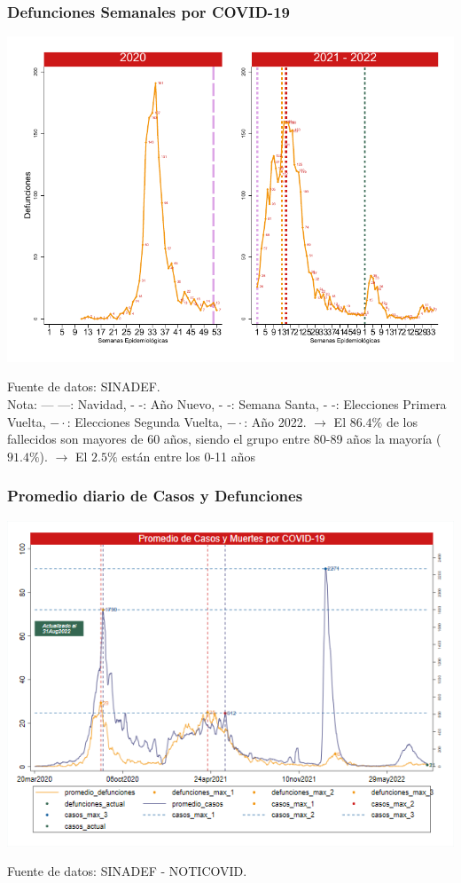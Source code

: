 \documentclass[xcolor=table]{beamer}
\begin{document}
\begin{frame}
	\frametitle{Defunciones Semanales por COVID-19}
	\vspace{-.5cm}
	\begin{center}
		\includegraphics[width=0.9\linewidth, trim={0cm .5cm 0cm 0.2cm},clip]{../figuras/defunciones_semanales_20_21_22.pdf}
	\end{center}
	{\tiny Fuente de datos: SINADEF.\\
	Nota: {\color{mycolor1} --- ---: Navidad}, {\color{mycolor1} - -: Año Nuevo}, {\color{mycolor2} - -: Semana Santa}, {\color{mycolor3} - -: Elecciones Primera Vuelta}, {\color{mycolor4} $- \cdot$: Elecciones Segunda Vuelta},
	{\color{mycolor7} $- \cdot$: Año 2022}. 
	$\rightarrow$ El $86.4\%$ de los fallecidos son mayores de 60 años, siendo el grupo entre 80-89 años la mayoría ($91.4\%$).
	$\rightarrow$ El $2.5\%$ están entre los 0-11 años\\}
\end{frame}
	
\begin{frame}
	\frametitle{Promedio diario de Casos y Defunciones}
	\vspace{-.5cm}
	\begin{center}
		\includegraphics[width=0.9\linewidth, trim={0cm .5cm 0cm 0.2cm},clip]{../figuras/promedio_casos_defuncion_2020_2021_2022.png}
	\end{center}
	{\tiny Fuente de datos: SINADEF - NOTICOVID.}\\
\end{frame}
	
\end{document}
